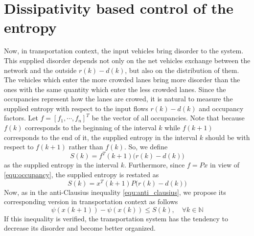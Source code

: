 \documentclass[trsc,nonblindrev]{informs3} %
\renewcommand{\vec}[1]{#1}
\newcommand{\mat}[1]{#1}
\begin{document}
\section{Dissipativity based control of the entropy}
\label{sec:dissipativity}

Now, in transportation context, the input vehicles bring disorder to
the system. This supplied disorder depends not only on  the  net vehicles exchange between the network and the outside  $\vec{r}(k)-\vec{d}(k)$, but also on the distribution of them. The vehicles
which enter the more crowded lanes bring more disorder than the ones
with the same quantity which enter the less crowded lanes. Since the
occupancies represent how the lanes are crowed, it is natural to
measure the supplied entropy with respect to the input flows $\vec{r}(k)-\vec{d}(k)$ and 
occupancy factors. Let $\vec{f}=[f_1,\cdots,f_n]^T$ be the vector of
all occupancies. Note that because $\vec{f}(k)$ corresponds to the
beginning of the interval $k$ while $\vec{f}(k+1)$ corresponds to the
end of it, the supplied entropy in the interval $k$ should be with respect 
to $\vec{f}(k+1)$ rather than $\vec{f}(k)$. So, we define
$$S(k)=\vec{f}^T(k+1)\bigl(\vec{r}(k)-d(k)\bigr)$$
as the supplied entropy in the interval $k$. Furthermore, since
$\vec{f}=\mat{P}\vec{x}$ in view of \eqref{equ:occupancy}, the
supplied entropy is restated as
\begin{equation}\label{equ:supply}
    S(k)=\vec{x}^T(k+1) \mat{P} \bigl(\vec{r}(k)-\vec{d}(k)\bigr)
\end{equation}
Now, as in the anti-Clausius inequality \eqref{equ:anti_clausius}, we
propose its corresponding version in transportation context as
follows
\begin{equation}\label{equ:dissipative}
\psi(\vec{x}(k+1))-\psi(\vec{x}(k)) \leq S(k),\quad \forall
k\in\mathbb{N}
\end{equation}
If this inequality is verified, the transportation system has the
tendency to decrease its disorder and become better organized.
\end{document}
